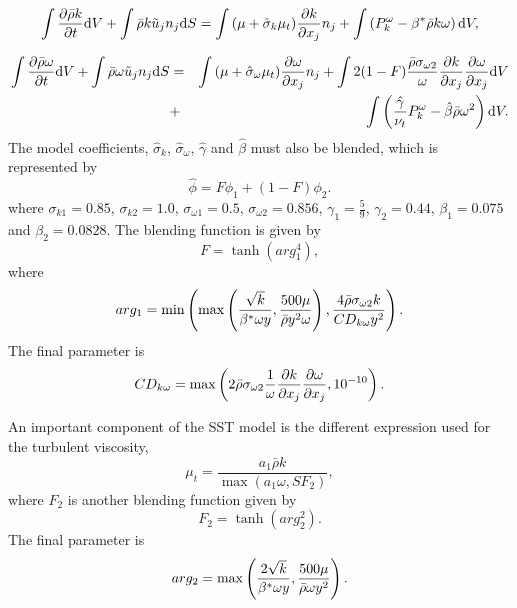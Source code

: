 \begin{eqnarray}
\int{\partial \bar{\rho} k \over \partial t}\text{d}V + \int \bar{\rho} k\tilde{u}_{j} n_{j} \text{d} S = \int {(\mu + \hat \sigma_k \mu_{t})} {\partial k \over \partial x_{j}} n_{j} + \int \left(P_{k}^{\omega} - \beta^* \bar{\rho} k \omega\right) \text{d} V,
\end{eqnarray}

\begin{eqnarray}
\int {\partial \bar{\rho} \omega \over \partial t}\text{d} V + \int \bar{\rho} \omega \tilde{u}_{j} n_{j} \text{d}S &=& 
\int  {(\mu + \hat\sigma_{\omega} \mu_{t})} {\partial \omega \over \partial x_{j}} n_{j}
+ \int  {2(1-F) \frac{\bar{\rho}\sigma_{\omega2}} {\omega} {\partial k \over \partial x_j} {\partial \omega \over \partial x_j} } \text{d}V \nonumber \\ 
&+&  \int \left(\frac{\hat\gamma}{\nu_t} P_{k}^{\omega} - \hat \beta \bar{\rho} \omega^{2}\right) \text{d}V.
\end{eqnarray}
%
The model coefficients, $\hat\sigma_k$, $\hat\sigma_{\omega}$, $\hat\gamma$ and $\hat\beta$ must also be blended, which is represented by
\begin{equation}
\hat \phi = F\phi_1+ (1-F)\phi_2.
\end{equation}
where $\sigma_{k1} = 0.85$, $\sigma_{k2} = 1.0$,  $\sigma_{\omega1} = 0.5$, $\sigma_{\omega2} = 0.856$, $\gamma_1 = \frac{5}{9}$, $\gamma_2 = 0.44$,
$\beta_1 = 0.075$ and $\beta_2 = 0.0828$.  
%
The blending function is given by
\begin{equation}
F = \tanh(arg_{1}^{4}),
\end{equation}
where
\begin{equation}
arg_{1} = \min \left( \max \left( {\sqrt{k} \over \beta^* \omega y}, {500 \mu \over \bar{\rho} y^{2} \omega}\right), {4 \bar{\rho} \sigma_{\omega2} k \over CD_{k\omega} y^{2}} \right).
\end{equation}
The final parameter is
\begin{equation}
CD_{k\omega} = \max \left( 2 \bar{\rho} \sigma_{\omega2} \frac{1}{\omega} {\partial k \over \partial x_{j}} {\partial \omega \over \partial x_{j}}, 10^{-10} \right).
\end{equation}

An important component of the SST model is the different expression used for the turbulent viscosity,
\begin{equation}
\mu_{t} = \frac {a_1 \bar{\rho} k} {\max\left( a_1 \omega, S F_2 \right) },
\end{equation}
where $F_2$ is another blending function given by
\begin{equation}
F_2 = \tanh(arg_{2}^{2}).
\end{equation}
The final parameter is
\begin{equation}
arg_{2} = \max\left({2 \sqrt{k} \over \beta^* \omega y}, {500 \mu \over \bar{\rho} \omega y^{2}} \right).
\end{equation}

